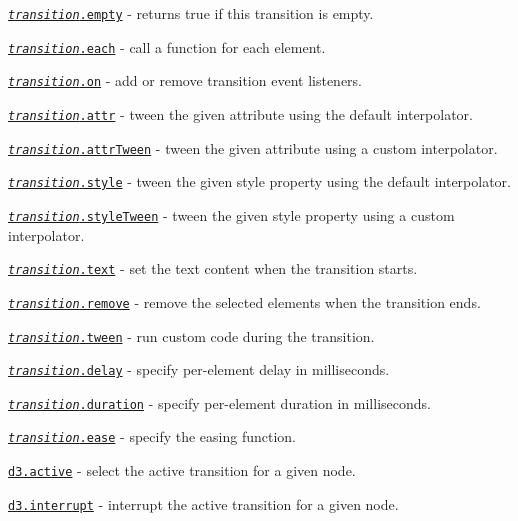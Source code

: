\begin{DoxyItemize}
\item \href{https://github.com/d3/d3-transition/blob/master/README.md#transition_empty}{\tt {\itshape transition}.empty} -\/ returns true if this transition is empty.
\item \href{https://github.com/d3/d3-transition/blob/master/README.md#transition_each}{\tt {\itshape transition}.each} -\/ call a function for each element.
\item \href{https://github.com/d3/d3-transition/blob/master/README.md#transition_on}{\tt {\itshape transition}.on} -\/ add or remove transition event listeners.
\item \href{https://github.com/d3/d3-transition/blob/master/README.md#transition_attr}{\tt {\itshape transition}.attr} -\/ tween the given attribute using the default interpolator.
\item \href{https://github.com/d3/d3-transition/blob/master/README.md#transition_attrTween}{\tt {\itshape transition}.attr\+Tween} -\/ tween the given attribute using a custom interpolator.
\item \href{https://github.com/d3/d3-transition/blob/master/README.md#transition_style}{\tt {\itshape transition}.style} -\/ tween the given style property using the default interpolator.
\item \href{https://github.com/d3/d3-transition/blob/master/README.md#transition_styleTween}{\tt {\itshape transition}.style\+Tween} -\/ tween the given style property using a custom interpolator.
\item \href{https://github.com/d3/d3-transition/blob/master/README.md#transition_text}{\tt {\itshape transition}.text} -\/ set the text content when the transition starts.
\item \href{https://github.com/d3/d3-transition/blob/master/README.md#transition_remove}{\tt {\itshape transition}.remove} -\/ remove the selected elements when the transition ends.
\item \href{https://github.com/d3/d3-transition/blob/master/README.md#transition_tween}{\tt {\itshape transition}.tween} -\/ run custom code during the transition.
\item \href{https://github.com/d3/d3-transition/blob/master/README.md#transition_delay}{\tt {\itshape transition}.delay} -\/ specify per-\/element delay in milliseconds.
\item \href{https://github.com/d3/d3-transition/blob/master/README.md#transition_duration}{\tt {\itshape transition}.duration} -\/ specify per-\/element duration in milliseconds.
\item \href{https://github.com/d3/d3-transition/blob/master/README.md#transition_ease}{\tt {\itshape transition}.ease} -\/ specify the easing function.
\item \href{https://github.com/d3/d3-transition/blob/master/README.md#active}{\tt d3.\+active} -\/ select the active transition for a given node.
\item \href{https://github.com/d3/d3-transition/blob/master/README.md#interrupt}{\tt d3.\+interrupt} -\/ interrupt the active transition for a given node.
\end{DoxyItemize}

